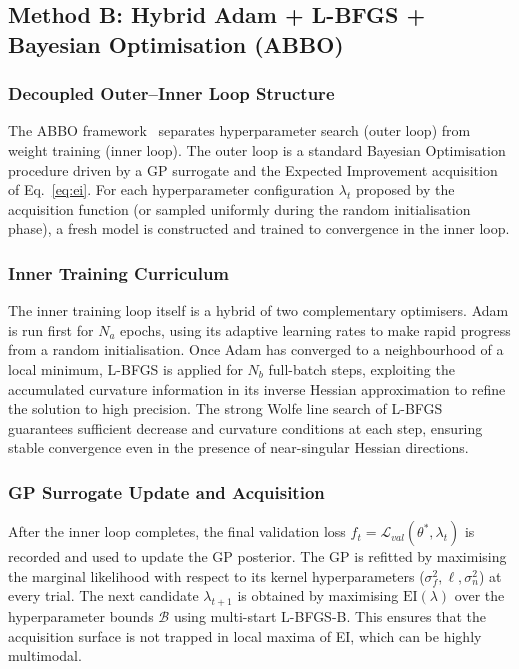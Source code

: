 \documentclass[12pt,a4paper]{article}
\begin{document}
\subsection{Method B: Hybrid Adam + L-BFGS + Bayesian Optimisation (ABBO)}

\subsubsection{Decoupled Outer--Inner Loop Structure}

The ABBO framework~\cite{snoek2012,liu1989lbfgs,kingma2015adam}
separates hyperparameter search (outer loop) from weight training
(inner loop).  The outer loop is a standard Bayesian Optimisation
procedure driven by a GP surrogate and the Expected Improvement
acquisition of Eq.~\eqref{eq:ei}.  For each hyperparameter
configuration $\lambda_t$ proposed by the acquisition function (or
sampled uniformly during the random initialisation phase), a fresh
model is constructed and trained to convergence in the inner loop.

\subsubsection{Inner Training Curriculum}

The inner training loop itself is a hybrid of two complementary
optimisers.  Adam is run first for $N_a$ epochs, using its adaptive
learning rates to make rapid progress from a random initialisation.
Once Adam has converged to a neighbourhood of a local minimum, L-BFGS
is applied for $N_b$ full-batch steps, exploiting the accumulated
curvature information in its inverse Hessian approximation to refine
the solution to high precision.  The strong Wolfe line search of
L-BFGS~\cite{wolfe1969} guarantees sufficient decrease and curvature
conditions at each step, ensuring stable convergence even in the
presence of near-singular Hessian directions.

\subsubsection{GP Surrogate Update and Acquisition}

After the inner loop completes, the final validation loss
$f_t = \mathcal{L}_{val}(\theta^*, \lambda_t)$ is recorded and used
to update the GP posterior.  The GP is refitted by maximising the
marginal likelihood with respect to its kernel hyperparameters
($\sigma_f^2, \ell, \sigma_n^2$) at every trial.  The next candidate
$\lambda_{t+1}$ is obtained by maximising $\mathrm{EI}(\lambda)$ over
the hyperparameter bounds $\mathcal{B}$ using multi-start L-BFGS-B.
This ensures that the acquisition surface is not trapped in local
maxima of EI, which can be highly multimodal.
\end{document}
